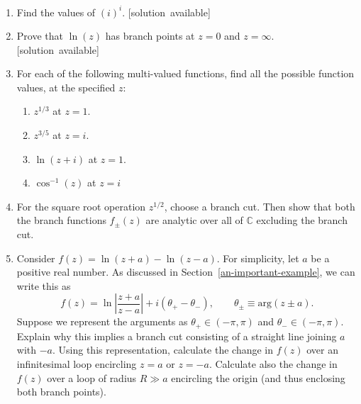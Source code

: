 \documentclass[10pt,a4paper]{article}
\begin{document}
\begin{enumerate}
\item
Find the values of $(i)^i$.
  \hfill{\scriptsize [solution~available]}

\item
Prove that $\ln(z)$ has branch points at $z = 0$ and $z = \infty$.
  \hfill{\scriptsize [solution~available]}

\item For each of the following multi-valued functions, find all the possible
function values, at the specified $z$:
\begin{enumerate}
\item $z^{1/3}$ at $z = 1$.

\item $z^{3/5}$ at $z = i$.

\item $\ln(z+i)$ at $z = 1$.

\item $\cos^{-1}(z)$ at $z = i$
\end{enumerate}

\item
For the square root operation $z^{1/2}$, choose a branch cut. Then
show that both the branch functions $f_\pm(z)$ are analytic over all
of $\mathbb{C}$ excluding the branch cut.

\item
  Consider $f(z) = \ln(z+a) - \ln(z-a)$. For simplicity, let $a$ be a
  positive real number. As discussed in
  Section~\ref{an-important-example}, we can write this as
\begin{equation}
f(z) = \ln\left|\frac{z+a}{z-a}\right| + i(\theta_+ - \theta_-), \qquad \theta_\pm \equiv \mathrm{arg}(z\pm a).
\end{equation}
Suppose we represent the arguments as $\theta_+ \in (-\pi,\pi)$ and
$\theta_- \in (-\pi,\pi)$. Explain why this implies a branch cut
consisting of a straight line joining $a$ with $-a$. Using this
representation, calculate the change in $f(z)$ over an infinitesimal
loop encircling $z = a$ or $z = -a$. Calculate also the change in
$f(z)$ over a loop of radius $R \gg a$ encircling the origin (and
thus enclosing both branch points).
\end{enumerate}
\end{document}

